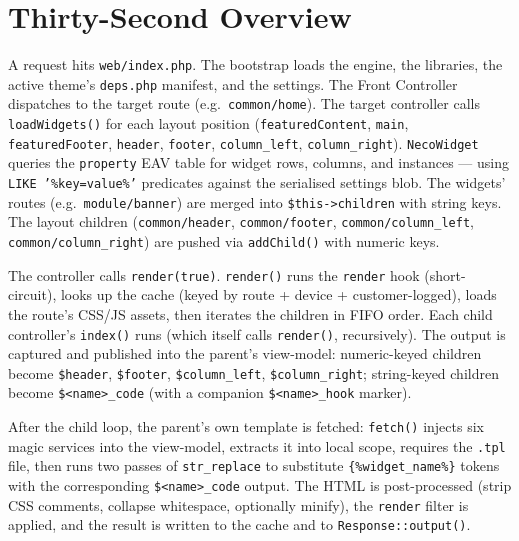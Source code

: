 \documentclass[11pt,a4paper]{article}
\begin{document}
\section{Thirty-Second Overview}\label{sec:overview}

A request hits \texttt{web/index.php}. The bootstrap loads the
engine, the libraries, the active theme's \texttt{deps.php}
manifest, and the settings. The Front Controller dispatches to
the target route (e.g.\ \texttt{common/home}). The target
controller calls \texttt{loadWidgets()} for each layout position
(\texttt{featuredContent}, \texttt{main}, \texttt{featuredFooter},
\texttt{header}, \texttt{footer}, \texttt{column\_left},
\texttt{column\_right}). \texttt{NecoWidget} queries the
\texttt{property} EAV table for widget rows, columns, and
instances --- using \texttt{LIKE '\%key=value\%'} predicates
against the serialised settings blob. The widgets' routes
(e.g.\ \texttt{module/banner}) are merged into
\texttt{\$this->children} with string keys. The layout children
(\texttt{common/header}, \texttt{common/footer},
\texttt{common/column\_left}, \texttt{common/column\_right}) are
pushed via \texttt{addChild()} with numeric keys.

The controller calls \texttt{render(true)}. \texttt{render()}
runs the \texttt{render} hook (short-circuit), looks up the
cache (keyed by route + device + customer-logged), loads the
route's CSS/JS assets, then iterates the children in FIFO order.
Each child controller's \texttt{index()} runs (which itself calls
\texttt{render()}, recursively). The output is captured and
published into the parent's view-model: numeric-keyed children
become \texttt{\$header}, \texttt{\$footer}, \texttt{\$column\_left},
\texttt{\$column\_right}; string-keyed children become
\texttt{\$<name>\_code} (with a companion \texttt{\$<name>\_hook}
marker).

After the child loop, the parent's own template is fetched:
\texttt{fetch()} injects six magic services into the view-model,
extracts it into local scope, requires the \texttt{.tpl} file, then
runs two passes of \texttt{str\_replace} to substitute
\texttt{\{\%widget\_name\%\}} tokens with the corresponding
\texttt{\$<name>\_code} output. The HTML is post-processed (strip
CSS comments, collapse whitespace, optionally minify), the
\texttt{render} filter is applied, and the result is written to
the cache and to \texttt{Response::output()}.
\end{document}
